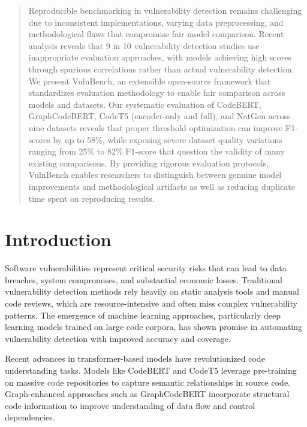 \documentclass[letterpaper]{article}
\begin{document}
\begin{abstract}
	Reproducible benchmarking in vulnerability detection remains challenging due to inconsistent implementations, varying data preprocessing, and methodological flaws that compromise fair model comparison. Recent analysis reveals that 9 in 10 vulnerability detection studies use inappropriate evaluation approaches, with models achieving high scores through spurious correlations rather than actual vulnerability detection. We present VulnBench, an extensible open-source framework that standardizes evaluation methodology to enable fair comparison across models and datasets. Our systematic evaluation of CodeBERT, GraphCodeBERT, CodeT5 (encoder-only and full), and NatGen across nine datasets reveals that proper threshold optimization can improve F1-scores by up to 58\%, while exposing severe dataset quality variations ranging from 25\% to 82\% F1-score that question the validity of many existing comparisons. By providing rigorous evaluation protocols, VulnBench enables researchers to distinguish between genuine model improvements and methodological artifacts as well as reducing duplicate time spent on reproducing results.
\end{abstract}



\section{Introduction}

Software vulnerabilities represent critical security risks that can lead to data breaches, system compromises, and substantial economic losses. Traditional vulnerability detection methods rely heavily on static analysis tools and manual code reviews, which are resource-intensive and often miss complex vulnerability patterns. The emergence of machine learning approaches, particularly deep learning models trained on large code corpora, has shown promise in automating vulnerability detection with improved accuracy and coverage.

Recent advances in transformer-based models have revolutionized code understanding tasks. Models like CodeBERT \citep{feng2020codebert} and CodeT5 \citep{wang2021codet5} leverage pre-training on massive code repositories to capture semantic relationships in source code. Graph-enhanced approaches such as GraphCodeBERT \citep{guo2021graphcodebert} incorporate structural code information to improve understanding of data flow and control dependencies.
\end{document}
